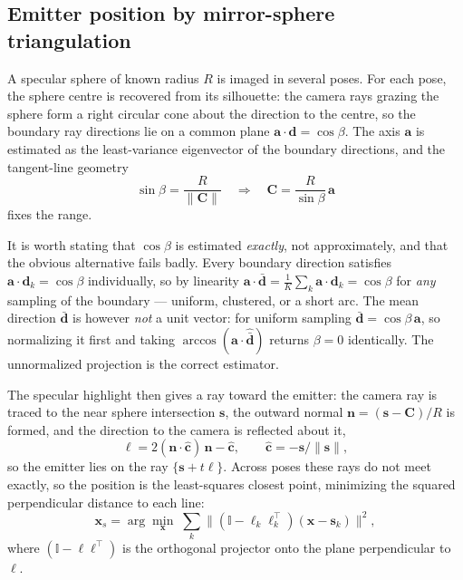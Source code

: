 \documentclass[journal,10pt]{IEEEtran}
\newcommand{\vecn}{\bm{n}}
\newcommand{\vecx}{\bm{x}}
\begin{document}
\subsection{Emitter position by mirror-sphere triangulation}
A specular sphere of known radius $R$ is imaged in several poses. For each pose,
the sphere centre is recovered from its silhouette: the camera rays grazing the
sphere form a right circular cone about the direction to the centre, so the
boundary ray directions lie on a common plane $\bm{a}\cdot\bm{d}=\cos\beta$. The
axis $\bm{a}$ is estimated as the least-variance eigenvector of the boundary
directions, and the tangent-line geometry
\begin{equation}
\sin\beta = \frac{R}{\lVert \bm{C}\rVert}
\quad\Longrightarrow\quad
\bm{C} = \frac{R}{\sin\beta}\,\bm{a}
\end{equation}
fixes the range.

It is worth stating that $\cos\beta$ is estimated \emph{exactly}, not
approximately, and that the obvious alternative fails badly. Every boundary
direction satisfies $\bm{a}\cdot\bm{d}_k=\cos\beta$ individually, so by linearity
$\bm{a}\cdot\bar{\bm{d}} = \tfrac{1}{K}\sum_k \bm{a}\cdot\bm{d}_k = \cos\beta$
for \emph{any} sampling of the boundary --- uniform, clustered, or a short arc.
The mean direction $\bar{\bm{d}}$ is however \emph{not} a unit vector: for
uniform sampling $\bar{\bm{d}} = \cos\beta\,\bm{a}$, so normalizing it first and
taking $\arccos(\bm{a}\cdot\hat{\bar{\bm{d}}})$ returns $\beta = 0$ identically.
The unnormalized projection is the correct estimator.

The specular highlight then gives a ray toward the emitter: the
camera ray is traced to the near sphere intersection $\bm{s}$, the outward normal
$\vecn = (\bm{s}-\bm{C})/R$ is formed, and the direction to the camera is
reflected about it,
\begin{equation}
\bm{\ell} = 2(\vecn\cdot\hat{\bm{c}})\,\vecn - \hat{\bm{c}},
\qquad \hat{\bm{c}} = -\bm{s}/\lVert\bm{s}\rVert ,
\end{equation}
so the emitter lies on the ray $\{\bm{s} + t\bm{\ell}\}$. Across poses these rays
do not meet exactly, so the position is the least-squares closest point,
minimizing the squared perpendicular distance to each line:
\begin{equation}
\vecx_s = \arg\min_{\vecx}\;\sum_k
\bigl\lVert (\mathbb{I} - \bm{\ell}_k\bm{\ell}_k^{\!\top})(\vecx - \bm{s}_k)
\bigr\rVert^2 ,
\label{eq:triang}
\end{equation}
where $(\mathbb{I}-\bm{\ell}\bm{\ell}^{\!\top})$ is the orthogonal projector onto
the plane perpendicular to $\bm{\ell}$.
\end{document}
